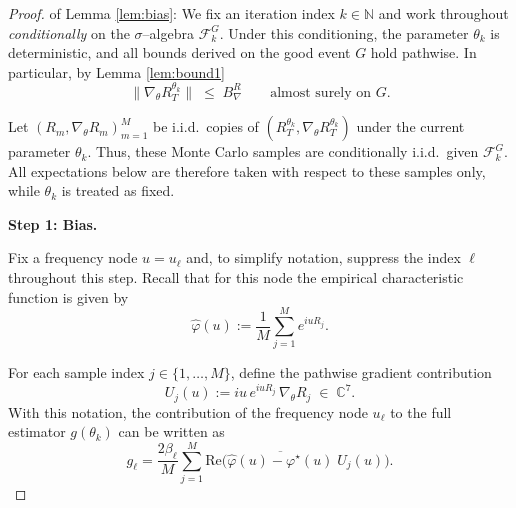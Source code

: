 \documentclass[reqno, 11pt]{amsart}%
\newcommand\cF{\mathcal F}
\theoremstyle{definition}
\begin{document}
\begin{proof}
of Lemma \ref{lem:bias}: We fix an iteration index $k\in\mathbb N$ and work throughout \emph{conditionally} on the
$\sigma$--algebra $\cF_k^G$.
Under this conditioning, the parameter $\theta_k$ is deterministic, and all bounds derived
on the good event $G$ hold pathwise.
In particular, by Lemma \ref{lem:bound1}
\[
\|\nabla_\theta R_T^{\theta_k}\|\;\le\; B_\nabla^R
\qquad\text{almost surely on } G.
\]

Let $(R_m,\nabla_\theta R_m)_{m=1}^M$ be i.i.d.\ copies of
$(R_T^{\theta_k},\nabla_\theta R_T^{\theta_k})$ under the current parameter $\theta_k$. Thus, these Monte Carlo samples are conditionally i.i.d.\ given $\cF_k^G$. All expectations below are therefore taken with respect to these samples only, while $\theta_k$ is treated as fixed.

\medskip
\noindent\textbf{Step 1: Bias.}

Fix a frequency node $u=u_\ell$ and, to simplify notation, suppress the index $\ell$
throughout this step.
Recall that for this node the empirical characteristic function is given by
\[
\widehat\varphi(u)
:=
\frac1M\sum_{j=1}^M e^{iu R_j}.
\]

For each sample index $j\in\{1,\dots,M\}$, define the pathwise gradient contribution
\[
U_j(u)
:=
iu\,e^{iu R_j}\,\nabla_\theta R_j
\;\in\;\mathbb{C}^7.
\]
With this notation, the contribution of the frequency node $u_\ell$ to the full estimator
$g(\theta_k)$ can be written as
\[
g_\ell
=
\frac{2\beta_\ell}{M}\sum_{j=1}^M
\text{Re}\Big(
\overline{\widehat\varphi(u)-\varphi^\star(u)}\;
U_j(u)
\Big).
\]


\end{proof}
\end{document}
